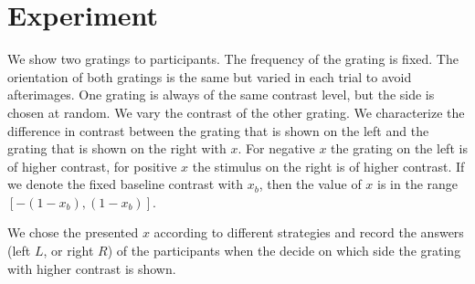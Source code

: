 
\section{Experiment} %
\label{sec:experiment}

We show two gratings to participants. The frequency of the grating is fixed. The orientation of both gratings is the same but varied in each trial to avoid afterimages. One grating is always of the same contrast level, but the side is chosen at random. We vary the contrast of the other grating.
We characterize the difference in contrast between the grating that is shown on the left and the grating that is shown on the right with $x$. For negative $x$ the grating on the left is of higher contrast, for positive $x$ the stimulus on the right is of higher contrast. If we denote the fixed baseline contrast with $x_b$, then the value of $x$ is in the range $[-(1-x_b), (1-x_b)]$.

We chose the presented $x$ according to different strategies and record the answers (left $L$, or right $R$) of the participants when the decide on which side the grating with higher contrast is shown.

